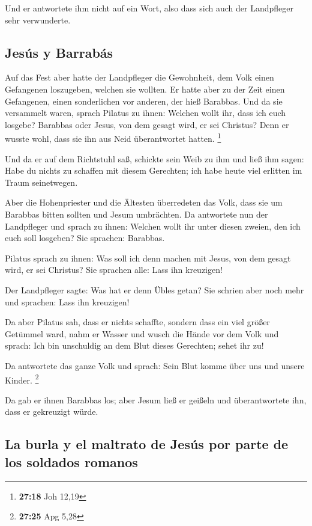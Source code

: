  Und er antwortete ihm nicht auf ein Wort, also dass sich
auch der Landpfleger sehr verwunderte.

\hypertarget{jesuxfas-y-barrabuxe1s}{%
\subsection{Jesús y Barrabás}\label{jesuxfas-y-barrabuxe1s}}

 Auf das Fest aber hatte der Landpfleger die Gewohnheit,
dem Volk einen Gefangenen loszugeben, welchen sie wollten.
 Er hatte aber zu der Zeit einen Gefangenen, einen
sonderlichen vor anderen, der hieß Barabbas.  Und da sie
versammelt waren, sprach Pilatus zu ihnen: Welchen wollt ihr, dass ich
euch losgebe? Barabbas oder Jesus, von dem gesagt wird, er sei Christus?
 Denn er wusste wohl, dass sie ihn aus Neid überantwortet
hatten. \footnote{\textbf{27:18} Joh 12,19}

 Und da er auf dem Richtstuhl saß, schickte sein Weib zu
ihm und ließ ihm sagen: Habe du nichts zu schaffen mit diesem Gerechten;
ich habe heute viel erlitten im Traum seinetwegen.

 Aber die Hohenpriester und die Ältesten überredeten das
Volk, dass sie um Barabbas bitten sollten und Jesum umbrächten.
 Da antwortete nun der Landpfleger und sprach zu ihnen:
Welchen wollt ihr unter diesen zweien, den ich euch soll losgeben? Sie
sprachen: Barabbas.

 Pilatus sprach zu ihnen: Was soll ich denn machen mit
Jesus, von dem gesagt wird, er sei Christus? Sie sprachen alle: Lass ihn
kreuzigen!

 Der Landpfleger sagte: Was hat er denn Übles getan? Sie
schrien aber noch mehr und sprachen: Lass ihn kreuzigen!

 Da aber Pilatus sah, dass er nichts schaffte, sondern
dass ein viel größer Getümmel ward, nahm er Wasser und wusch die Hände
vor dem Volk und sprach: Ich bin unschuldig an dem Blut dieses
Gerechten; sehet ihr zu!

 Da antwortete das ganze Volk und sprach: Sein Blut komme
über uns und unsere Kinder. \footnote{\textbf{27:25} Apg 5,28}

 Da gab er ihnen Barabbas los; aber Jesum ließ er geißeln
und überantwortete ihn, dass er gekreuzigt würde.

\hypertarget{la-burla-y-el-maltrato-de-jesuxfas-por-parte-de-los-soldados-romanos}{%
\subsection{La burla y el maltrato de Jesús por parte de los soldados
romanos}\label{la-burla-y-el-maltrato-de-jesuxfas-por-parte-de-los-soldados-romanos}}

